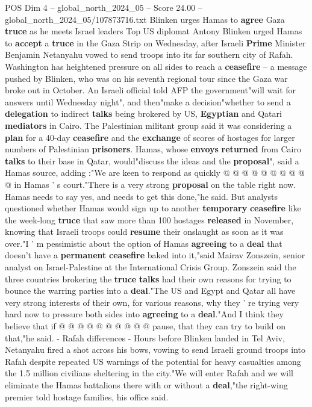 \begin{textsample}{POS Dim 4 – global\_north\_2024\_05 – Score 24.00 – global\_north\_2024\_05/107873716.txt}  \label{ex:f4_pos_341}
Blinken urges Hamas to \textbf{agree} Gaza \textbf{truce} as he meets Israel leaders Top US diplomat Antony Blinken urged Hamas to \textbf{accept} a \textbf{truce} in the Gaza Strip on Wednesday, after Israeli \textbf{Prime} Minister Benjamin Netanyahu vowed to send troops into its far southern city of Rafah.
Washington has heightened pressure on all sides to reach a \textbf{ceasefire} -- a message pushed by Blinken, who was on his seventh regional tour since the Gaza war broke out in October.
An Israeli official told AFP the government"will wait for answers until Wednesday night", and then"make a decision"whether to send a \textbf{delegation} to indirect \textbf{talks} being brokered by US, \textbf{Egyptian} and Qatari \textbf{mediators} in Cairo.
The Palestinian militant group said it was considering a \textbf{plan} for a 40-day \textbf{ceasefire} and the \textbf{exchange} of scores of hostages for larger numbers of Palestinian \textbf{prisoners}.
Hamas, whose \textbf{envoys} \textbf{returned} from Cairo \textbf{talks} to their base in Qatar, would"discuss the ideas and the \textbf{proposal}", said a Hamas source, adding :"We are keen to respond as quickly @ @ @ @ @ @ @ @ @ @ in Hamas ' s court."There is a very strong \textbf{proposal} on the table right now.
Hamas needs to say yes, and needs to get this done,"he said.
But analysts questioned whether Hamas would sign up to another \textbf{temporary} \textbf{ceasefire} like the week-long \textbf{truce} that saw more than 100 hostages \textbf{released} in November, knowing that Israeli troops could \textbf{resume} their onslaught as soon as it was over."I ' m pessimistic about the option of Hamas \textbf{agreeing} to a \textbf{deal} that doesn't have a \textbf{permanent} \textbf{ceasefire} baked into it,"said Mairav Zonszein, senior analyst on Israel-Palestine at the International Crisis Group.
Zonszein said the three countries brokering the \textbf{truce} \textbf{talks} had their own reasons for trying to bounce the warring parties into a \textbf{deal}."The US and Egypt and Qatar all have very strong interests of their own, for various reasons, why they ' re trying very hard now to pressure both sides into \textbf{agreeing} to a \textbf{deal}."And I think they believe that if @ @ @ @ @ @ @ @ @ @ pause, that they can try to build on that,"he said. - Rafah differences - Hours before Blinken landed in Tel Aviv, Netanyahu fired a shot across his bows, vowing to send Israeli ground troops into Rafah despite repeated US warnings of the potential for heavy casualties among the 1.5 million civilians sheltering in the city."We will enter Rafah and we will eliminate the Hamas battalions there with or without a \textbf{deal},"the right-wing premier told hostage families, his office said.

\end{textsample}
